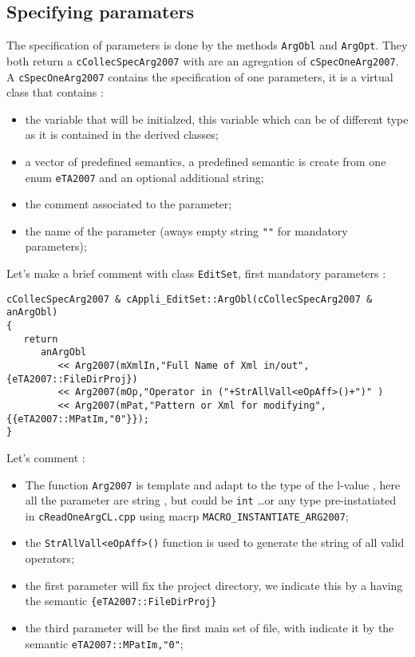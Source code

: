 \documentclass[a4paper]{book}
\begin{document}
\subsection{Specifying paramaters}


The specification of parameters is done by the methods {\tt ArgObl} and {\tt ArgOpt}.
They both return a {\tt cCollecSpecArg2007} with are an agregation of {\tt cSpecOneArg2007}.
A {\tt cSpecOneArg2007} contains the specification of one parameters, it is
a virtual class that contains :

\begin{itemize}
   \item  the variable that will be initialzed, this variable which can be of different type
          as it is contained in the derived classes;

   \item  a vector of predefined semantics, a predefined semantic is create from one
          enum {\tt eTA2007} and an optional additional string;
   \item  the comment associated to the parameter;
   \item  the name of the parameter (aways empty string {\tt ""} for mandatory parameters);
\end{itemize}

Let's make a brief comment with class {\tt EditSet}, first mandatory parameters :

{\small
\begin{verbatim}
cCollecSpecArg2007 & cAppli_EditSet::ArgObl(cCollecSpecArg2007 & anArgObl)
{
   return
      anArgObl
         << Arg2007(mXmlIn,"Full Name of Xml in/out",{eTA2007::FileDirProj})
         << Arg2007(mOp,"Operator in ("+StrAllVall<eOpAff>()+")" )
         << Arg2007(mPat,"Pattern or Xml for modifying",{{eTA2007::MPatIm,"0"}});
}
\end{verbatim}
}

Let's comment :

\begin{itemize}
   \item The function {\tt Arg2007} is template and adapt to the type of the
         l-value , here all the parameter are string , but could be {\tt int} \dots or
         any type pre-instatiated in {\tt cReadOneArgCL.cpp} using macrp {\tt MACRO\_INSTANTIATE\_ARG2007};

   \item the {\tt StrAllVall<eOpAff>()} function is used to generate the string of all valid operators;

   \item the first parameter will fix the project directory, we indicate this by a having
         the semantic {\tt  \{eTA2007::FileDirProj\}}

   \item the third parameter will be the first main set of file, with indicate it by
         the semantic {\tt {eTA2007::MPatIm,"0"}};
\end{itemize}
\end{document}
